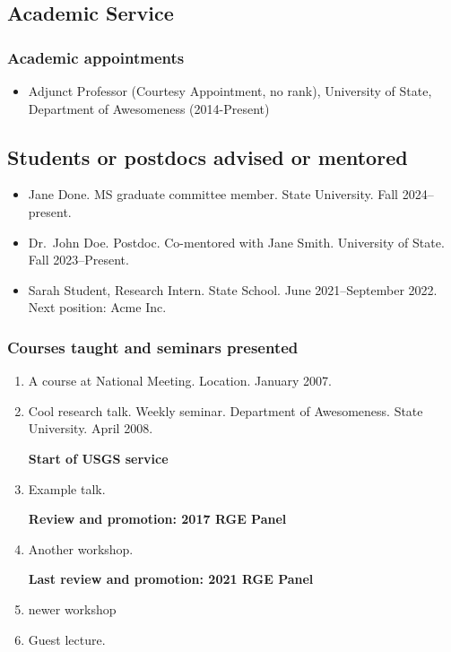 \subsection{Academic Service}\label{acSer}

\subsubsection*{Academic appointments}

\begin{itemize}
\item Adjunct Professor (Courtesy Appointment, no rank),
University of State, Department of Awesomeness (2014-Present)
\end{itemize}

\subsection*{Students or postdocs advised or mentored}\label{mentor}

\begin{itemize}
\item Jane Done.
  MS graduate committee member.
  State University.
  Fall 2024--present.
\item Dr.~John Doe.
  Postdoc.
  Co-mentored with Jane Smith.
  University of State.
  Fall 2023--Present.
\item Sarah Student,
  Research Intern.
  State School.
  June 2021--September 2022.
  Next position: Acme Inc.
\end{itemize}
 
\subsubsection*{Courses taught and seminars presented}

\begin{enumerate}
\item A course at National Meeting. Location. January 2007.
\item Cool research talk.
Weekly seminar.
Department of Awesomeness.
State University.
April 2008.
 
  \noindent\makebox[\linewidth]{\rule{\textwidth}{1pt}} 
  \textbf{Start of USGS service}
  
\item Example talk.
    
  \noindent\makebox[\linewidth]{\rule{\textwidth}{1pt}}
  \textbf{Review and promotion: 2017 RGE Panel} 
  
\item Another workshop. 

  \noindent\makebox[\linewidth]{\rule{\textwidth}{1pt}}
  \textbf{Last review and promotion: 2021 RGE Panel} 

\item newer workshop

\item Guest lecture.
\end{enumerate}


